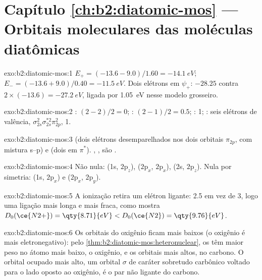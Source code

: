 \section*{Capítulo \ref{ch:b2:diatomic-mos} --- Orbitais moleculares das moléculas diatômicas}

\begin{solution}{exo:b2:diatomic-mos:1}
$E_+ = (-13.6 - 9.0)/1.60 = \qty{-14.1}{eV}$; $E_- = (-13.6 + 9.0)/0.40 = \qty{-11.5}{eV}$.
Dois elétrons em $\psi_+$: $-28.25$ contra $2 \times (-13.6) = \qty{-27.2}{eV}$, ligada por
\qty{1.05}{eV} nesse modelo grosseiro.
\end{solution}

\begin{solution}{exo:b2:diatomic-mos:2}
: $(2 - 2)/2 = 0$; : $(2 - 1)/2 = 0.5$; : 1; : seis
elétrons de valência, $\sigma_{2s}^2\sigma_{2s}^{*2}\pi_{2p}^2$,  1.
\end{solution}

\begin{solution}{exo:b2:diatomic-mos:3}
 (dois elétrons desemparelhados nos dois orbitais $\pi_{2p}$, com mistura s--p) e
 (dois em $\pi^*$). , ,  são .
\end{solution}

\begin{solution}{exo:b2:diatomic-mos:4}
Não nula: (1s, $2\mathrm p_z$), ($2\mathrm p_x$, $2\mathrm p_x$), (2s, $2\mathrm p_z$).
Nula por simetria: (1s, $2\mathrm p_x$) e ($2\mathrm p_x$, $2\mathrm p_y$).
\end{solution}

\begin{solution}{exo:b2:diatomic-mos:5}
A ionização retira um elétron ligante:  2.5 em vez de 3, logo uma
ligação mais longa e mais fraca, como mostra $D_0(\ce{N2+}) = \qty{8.71}{eV} < D_0(\ce{N2}) = \qty{9.76}{eV}$.
\end{solution}

\begin{solution}{exo:b2:diatomic-mos:6}
Os orbitais do oxigênio ficam mais baixos (o oxigênio é mais eletronegativo):
pelo \cref{thm:b2:diatomic-mos:heteronuclear}, os  têm maior
peso no átomo mais baixo, o oxigênio, e os orbitais mais altos, no carbono. O
orbital ocupado mais alto, um orbital $\sigma$ de caráter sobretudo carbônico
voltado para o lado oposto ao oxigênio, é o par não ligante do carbono.
\end{solution}

